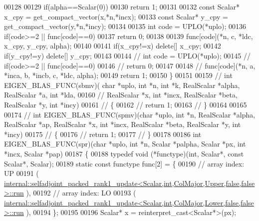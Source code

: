 \begin{DoxyCode}
00128 
00129   \textcolor{keywordflow}{if}(alpha==Scalar(0))
00130     \textcolor{keywordflow}{return} 1;
00131 
00132   \textcolor{keyword}{const} Scalar* x\_cpy = get\_compact\_vector(x,*n,*incx);
00133   \textcolor{keyword}{const} Scalar* y\_cpy = get\_compact\_vector(y,*n,*incy);
00134 
00135   \textcolor{keywordtype}{int} code = UPLO(*uplo);
00136   \textcolor{keywordflow}{if}(code>=2 || func[code]==0)
00137     \textcolor{keywordflow}{return} 0;
00138 
00139   func[code](*n, c, *ldc, x\_cpy, y\_cpy, alpha);
00140 
00141   \textcolor{keywordflow}{if}(x\_cpy!=x)  \textcolor{keyword}{delete}[] x\_cpy;
00142   \textcolor{keywordflow}{if}(y\_cpy!=y)  \textcolor{keyword}{delete}[] y\_cpy;
00143 
00144 \textcolor{comment}{//   int code = UPLO(*uplo);}
00145 \textcolor{comment}{//   if(code>=2 || func[code]==0)}
00146 \textcolor{comment}{//     return 0;}
00147 
00148 \textcolor{comment}{//   func[code](*n, a, *inca, b, *incb, c, *ldc, alpha);}
00149   \textcolor{keywordflow}{return} 1;
00150 \}
00151 
00159 \textcolor{comment}{// int EIGEN\_BLAS\_FUNC(sbmv)( char *uplo, int *n, int *k, RealScalar *alpha, RealScalar *a, int *lda,}
00160 \textcolor{comment}{//                            RealScalar *x, int *incx, RealScalar *beta, RealScalar *y, int *incy)}
00161 \textcolor{comment}{// \{}
00162 \textcolor{comment}{//   return 1;}
00163 \textcolor{comment}{// \}}
00164 
00165 
00174 \textcolor{comment}{// int EIGEN\_BLAS\_FUNC(spmv)(char *uplo, int *n, RealScalar *alpha, RealScalar *ap, RealScalar *x, int
       *incx, RealScalar *beta, RealScalar *y, int *incy)}
00175 \textcolor{comment}{// \{}
00176 \textcolor{comment}{//   return 1;}
00177 \textcolor{comment}{// \}}
00178 
00186 \textcolor{keywordtype}{int} EIGEN\_BLAS\_FUNC(spr)(\textcolor{keywordtype}{char} *uplo, \textcolor{keywordtype}{int} *n, Scalar *palpha, Scalar *px, \textcolor{keywordtype}{int} *incx, Scalar *pap)
00187 \{
00188   \textcolor{keyword}{typedef} void (*functype)(int, Scalar*, \textcolor{keyword}{const} Scalar*, Scalar);
00189   \textcolor{keyword}{static} \textcolor{keyword}{const} functype func[2] = \{
00190     \textcolor{comment}{// array index: UP}
00191     (
      \hyperlink{structinternal_1_1selfadjoint__packed__rank1__update}{internal::selfadjoint\_packed\_rank1\_update<Scalar,int,ColMajor,Upper,false,false>::run}
      ),
00192     \textcolor{comment}{// array index: LO}
00193     (
      \hyperlink{structinternal_1_1selfadjoint__packed__rank1__update}{internal::selfadjoint\_packed\_rank1\_update<Scalar,int,ColMajor,Lower,false,false>::run}
      ),
00194   \};
00195 
00196   Scalar* x = \textcolor{keyword}{reinterpret\_cast<}Scalar*\textcolor{keyword}{>}(px);

\end{DoxyCode}
